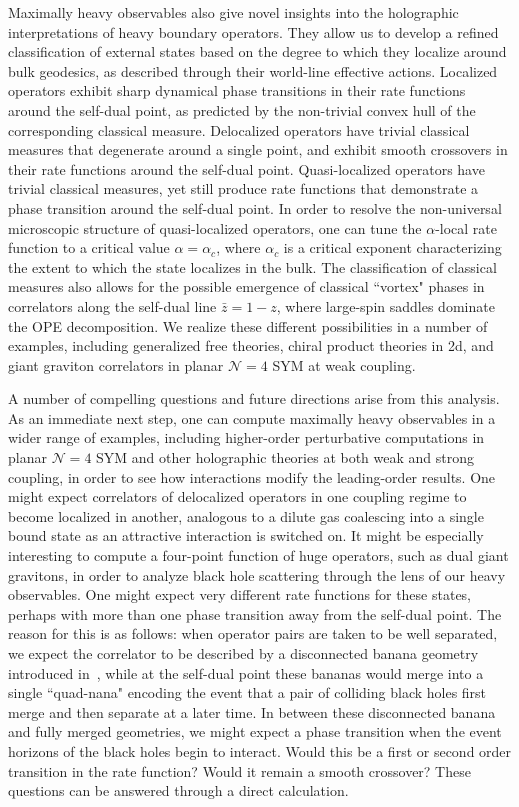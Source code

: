 \documentclass[a4paper,11pt]{article}
\theoremstyle{plain}
\theoremstyle{definition}
\theoremstyle{remark}
\begin{document}
Maximally heavy observables also give novel insights into the holographic interpretations of heavy boundary operators. They allow us to develop a refined classification of external states based on the degree to which they localize around bulk geodesics, as described through their world-line effective actions. Localized operators exhibit sharp dynamical phase transitions in their rate functions around the self-dual point, as predicted by the non-trivial convex hull of the corresponding classical measure. Delocalized operators have trivial classical measures that degenerate around a single point, and exhibit smooth crossovers in their rate functions around the self-dual point. Quasi-localized operators have trivial classical measures, yet still produce rate functions that demonstrate a phase transition around the self-dual point. In order to resolve the non-universal microscopic structure of quasi-localized operators, one can tune the $\alpha$-local rate function to a critical value $\alpha =\alpha_c$, where $\alpha_c$ is a critical exponent characterizing the extent to which the state localizes in the bulk. The classification of classical measures also allows for the possible emergence of classical ``vortex" phases in correlators along the self-dual line $\bar{z} = 1-z$, where large-spin saddles dominate the OPE decomposition. We realize these different possibilities in a number of examples, including generalized free theories, chiral product theories in 2d, and giant graviton correlators in planar $\mathcal{N} = 4$ SYM at weak coupling.

A number of compelling questions and future directions arise from this analysis. As an immediate next step, one can compute maximally heavy observables in a wider range of examples, including higher-order perturbative computations in planar $\mathcal{N} = 4$ SYM and other holographic theories at both weak and strong coupling, in order to see how interactions modify the leading-order results. One might expect correlators of delocalized operators in one coupling regime to become localized in another, analogous to a dilute gas coalescing into a single bound state as an attractive interaction is switched on. It might be especially interesting to compute a four-point function of huge operators, such as dual giant gravitons, in order to analyze black hole scattering through the lens of our heavy observables. One might expect very different rate functions for these states, perhaps with more than one phase transition away from the self-dual point. The reason for this is as follows: when operator pairs are taken to be well separated, we expect the correlator to be described by a disconnected banana geometry introduced in~\cite{Abajian2023-xw}, while at the self-dual point these bananas would merge into a single ``quad-nana" encoding the event that a pair of colliding black holes first merge and then separate at a later time. In between these disconnected banana and fully merged geometries, we might expect a phase transition when the event horizons of the black holes begin to interact. Would this be a first or second order transition in the rate function? Would it remain a smooth crossover? These questions can be answered through a direct calculation.
\end{document}
